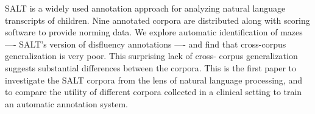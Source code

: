 SALT is a widely used annotation approach for analyzing natural language transcripts of children. Nine annotated corpora are distributed along with scoring software to provide norming data. We explore automatic identification of mazes ---- SALT's version of disfluency annotations ---- and find that cross-corpus generalization is very poor. This surprising lack of cross- corpus generalization suggests substantial differences between the corpora. This is the first paper to investigate the SALT corpora from the lens of natural language processing, and to compare the utility of different corpora collected in a clinical setting to train an automatic annotation system.
